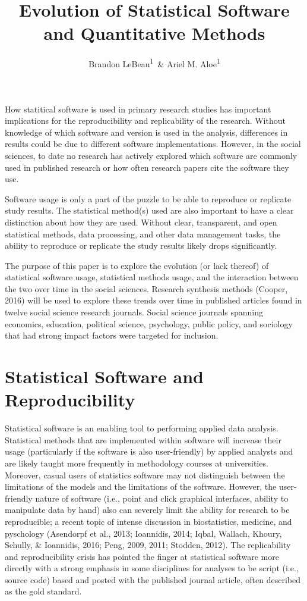 \documentclass[english,,man]{apa6}
\title{Evolution of Statistical Software and Quantitative Methods}
\author{Brandon LeBeau\textsuperscript{1}~\& Ariel M. Aloe\textsuperscript{1}}
\date{}
\affiliation{
\vspace{0.5cm}
\textsuperscript{1} University of Iowa}
\theoremstyle{definition}
\theoremstyle{definition}
\theoremstyle{definition}
\theoremstyle{remark}
\begin{document}
\maketitle

How statitical software is used in primary research studies has
important implications for the reproducibility and replicability of the
research. Without knowledge of which software and version is used in the
analysis, differences in results could be due to different software
implementations. However, in the social sciences, to date no research
has actively explored which software are commonly used in published
research or how often research papers cite the software they use.

Software usage is only a part of the puzzle to be able to reproduce or
replicate study results. The statistical method(s) used are also
important to have a clear distinction about how they are used. Without
clear, transparent, and open statistical methods, data processing, and
other data management tasks, the ability to reproduce or replicate the
study results likely drops significantly.

The purpose of this paper is to explore the evolution (or lack thereof)
of statistical software usage, statistical methods usage, and the
interaction between the two over time in the social sciences. Research
synthesis methods (Cooper, 2016) will be used to explore these trends
over time in published articles found in twelve social science research
journals. Social science journals spanning economics, education,
political science, psychology, public policy, and sociology that had
strong impact factors were targeted for inclusion.

\hypertarget{statistical-software-and-reproducibility}{%
\section{Statistical Software and
Reproducibility}\label{statistical-software-and-reproducibility}}

Statistical software is an enabling tool to performing applied data
analysis. Statistical methods that are implemented within software will
increase their usage (particularly if the software is also
user-friendly) by applied analysts and are likely taught more frequently
in methodology courses at universities. Moreover, casual users of
statistics software may not distinguish between the limitations of the
models and the limitations of the software. However, the user-friendly
nature of software (i.e., point and click graphical interfaces, ability
to manipulate data by hand) also can severely limit the ability for
research to be reproducible; a recent topic of intense discussion in
biostatistics, medicine, and pyschology (Asendorpf et al., 2013;
Ioannidis, 2014; Iqbal, Wallach, Khoury, Schully, \& Ioannidis, 2016;
Peng, 2009, 2011; Stodden, 2012). The replicability and reproducibility
crisis has pointed the finger at statistical software more directly with
a strong emphasis in some disciplines for analyses to be script (i.e.,
source code) based and posted with the published journal article, often
described as the gold standard.
\end{document}
